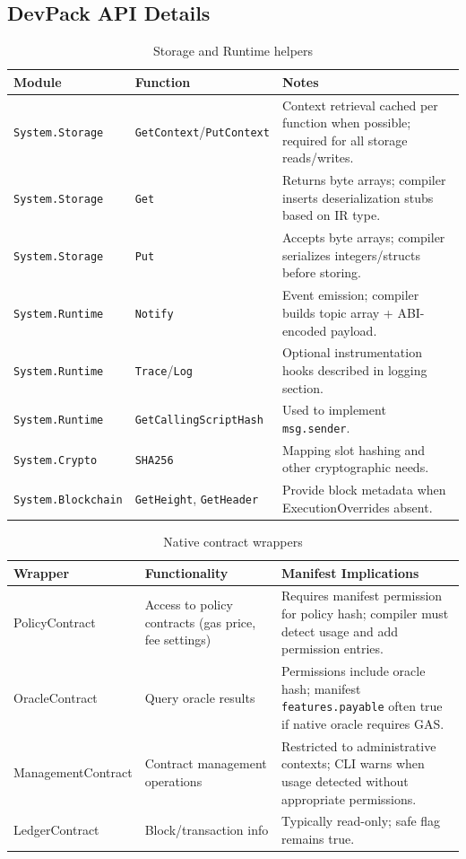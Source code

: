 \documentclass[11pt]{article}
\begin{document}
\subsection{DevPack API Details}
\begin{table}[H]
\centering
\caption{Storage and Runtime helpers}
\begin{tabularx}{\textwidth}{@{}p{}p{}X@{}}
\toprule
Module & Function & Notes \\
\midrule
\texttt{System.Storage} & \texttt{GetContext}/\texttt{PutContext} & Context retrieval cached per function when possible; required for all storage reads/writes.\\
\texttt{System.Storage} & \texttt{Get} & Returns byte arrays; compiler inserts deserialization stubs based on IR type.\\
\texttt{System.Storage} & \texttt{Put} & Accepts byte arrays; compiler serializes integers/structs before storing.\\
\texttt{System.Runtime} & \texttt{Notify} & Event emission; compiler builds topic array + ABI-encoded payload.\\
\texttt{System.Runtime} & \texttt{Trace}/\texttt{Log} & Optional instrumentation hooks described in logging section.\\
\texttt{System.Runtime} & \texttt{GetCallingScriptHash} & Used to implement \texttt{msg.sender}.\\
\texttt{System.Crypto} & \texttt{SHA256} & Mapping slot hashing and other cryptographic needs.\\
\texttt{System.Blockchain} & \texttt{GetHeight}, \texttt{GetHeader} & Provide block metadata when ExecutionOverrides absent.\\
\bottomrule
\end{tabularx}
\end{table}

\begin{table}[H]
\centering
\caption{Native contract wrappers}
\begin{tabularx}{\textwidth}{@{}p{}p{}X@{}}
\toprule
Wrapper & Functionality & Manifest Implications \\
\midrule
PolicyContract & Access to policy contracts (gas price, fee settings) & Requires manifest permission for policy hash; compiler must detect usage and add permission entries.\\
OracleContract & Query oracle results & Permissions include oracle hash; manifest \texttt{features.payable} often true if native oracle requires GAS.\\
ManagementContract & Contract management operations & Restricted to administrative contexts; CLI warns when usage detected without appropriate permissions.\\
LedgerContract & Block/transaction info & Typically read-only; safe flag remains true.\\
\bottomrule
\end{tabularx}
\end{table}
\end{document}
